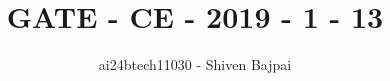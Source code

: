 \documentclass[journal]{IEEEtran}
\begin{document}
\onecolumn

\vspace{3cm}

\renewcommand{\thefigure}{\theenumi}
\renewcommand{\thetable}{\theenumi}

\title{GATE - CE - 2019 - 1 - 13}
\author{ai24btech11030 - Shiven Bajpai}
\maketitle

\iffalse
\begin{multicols}{4}
\begin{enumerate}
    \item 
    \item 
    \item 
    \item 
\end{enumerate}
\end{multicols}
\fi
\end{document}
